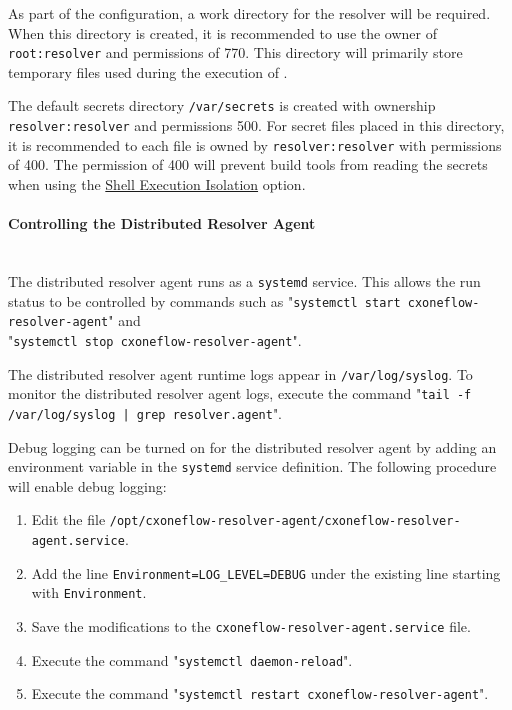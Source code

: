 As part of the configuration, a work directory for the resolver will be required.  When this directory
is created, it is recommended to use the owner of \texttt{root:resolver} and permissions of 770.  This
directory will primarily store temporary files used during the execution of \scaresolver.

The default secrets directory \texttt{/var/secrets} is created with ownership \texttt{resolver:resolver} and
permissions 500.  For secret files placed in this directory, it is recommended to each file is owned
by \texttt{resolver:resolver} with permissions of 400.  The permission of 400 will prevent 
build tools from reading the secrets when using the \hyperref[par:shell-agent-isolation]{Shell Execution Isolation} option.

\paragraph{Controlling the Distributed Resolver Agent}
\noindent\\The distributed resolver agent runs as a \texttt{systemd} service.  This allows the run status to be controlled
by commands such as "\texttt{systemctl start cxoneflow-resolver-agent}" and\\"\texttt{systemctl stop cxoneflow-resolver-agent}".

The distributed resolver agent runtime logs appear in \texttt{/var/log/syslog}.  To monitor the distributed resolver agent logs, execute the command
"\texttt{tail -f /var/log/syslog | grep resolver.agent}".

Debug logging can be turned on for the distributed resolver agent by adding an environment variable in the \texttt{systemd}
service definition.  The following procedure will enable debug logging:

\begin{enumerate}
  \item Edit the file \texttt{/opt/cxoneflow-resolver-agent/cxoneflow-resolver-agent.service}.
  \item Add the line \texttt{Environment=LOG\_LEVEL=DEBUG} under the existing line starting with \texttt{Environment}.
  \item Save the modifications to the \texttt{cxoneflow-resolver-agent.service} file.
  \item Execute the command "\texttt{systemctl daemon-reload}".
  \item Execute the command "\texttt{systemctl restart cxoneflow-resolver-agent}".
\end{enumerate}

